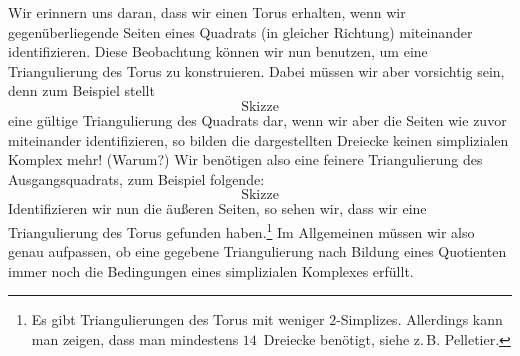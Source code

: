 \begin{thBeispiel}
    Wir erinnern uns daran, dass wir einen Torus erhalten, wenn wir
    gegenüberliegende Seiten eines Quadrats (in gleicher Richtung) miteinander
    identifizieren.
    Diese Beobachtung können wir nun benutzen, um eine Triangulierung des Torus
    zu konstruieren. Dabei müssen wir aber vorsichtig sein, denn zum Beispiel
    stellt 
    \[ \text{Skizze} \] %
    eine gültige Triangulierung des Quadrats dar, wenn wir aber die Seiten wie
    zuvor miteinander identifizieren, so bilden die dargestellten Dreiecke
    keinen simplizialen Komplex mehr! (Warum?) Wir benötigen also eine feinere
    Triangulierung des Ausgangsquadrats, zum Beispiel folgende:
    \[ \text{Skizze} \] %
    Identifizieren wir nun die äußeren Seiten, so sehen wir, dass wir eine
    Triangulierung des Torus gefunden haben.\footnote{%
        Es gibt Triangulierungen des Torus mit weniger $2$-Simplizes. Allerdings
        kann man zeigen, dass man mindestens $14$~Dreiecke benötigt, siehe
        z.\,B. Pelletier\cite{www:blog:rip:triangulation}.%
    }
    Im Allgemeinen müssen wir also genau aufpassen, ob eine gegebene
    Triangulierung nach Bildung eines Quotienten immer noch die Bedingungen
    eines simplizialen Komplexes erfüllt. 
\end{thBeispiel}

